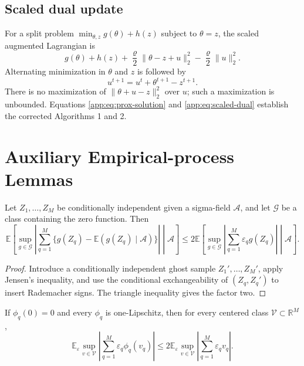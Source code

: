 \documentclass[twoside,11pt]{article}
\newenvironment{revision}{\color{revisionred}}{}
\begin{document}
\begin{revision}
\subsection{Scaled dual update}

For a split problem $\min_{\theta,z}g(\theta)+h(z)$ subject to $\theta=z$, the
scaled augmented Lagrangian is
\[
 g(\theta)+h(z)+\frac\varrho2\|\theta-z+u\|_2^2
 -\frac\varrho2\|u\|_2^2.
\]
Alternating minimization in $\theta$ and $z$ is followed by
\begin{equation}
 u^{t+1}=u^t+\theta^{t+1}-z^{t+1}.                              \label{app:eq:scaled-dual}
\end{equation}
There is no maximization of $\|\theta+u-z\|_2^2$ over $u$; such a maximization
is unbounded.  Equations \eqref{app:eq:prox-solution} and
\eqref{app:eq:scaled-dual} establish the corrected Algorithms 1 and 2.


\section{Auxiliary Empirical-process Lemmas}
\label{app:auxiliary}

\begin{lemma}
\label{app:lem:conditional-symm}
Let $Z_1,\ldots,Z_M$ be conditionally independent given a sigma-field
$\mathcal A$, and let $\mathcal G$ be a class containing the zero function.
Then
\[
 \mathbb E\left[\sup_{g\in\mathcal G}
 \left|\sum_{q=1}^M\{g(Z_q)-\mathbb E(g(Z_q)\mid\mathcal A)\}\right|
 \middle|\mathcal A\right]
 \le2\mathbb E\left[\sup_{g\in\mathcal G}
 \left|\sum_{q=1}^M\varepsilon_qg(Z_q)\right|
 \middle|\mathcal A\right].
\]
\end{lemma}

\begin{proof}
Introduce a conditionally independent ghost sample $Z_1',\ldots,Z_M'$, apply
Jensen's inequality, and use the conditional exchangeability of
$(Z_q,Z_q')$ to insert Rademacher signs.  The triangle inequality gives the
factor two.
\end{proof}

\begin{lemma}[Contraction]
\label{app:lem:contraction}
If $\phi_q(0)=0$ and every $\phi_q$ is one-Lipschitz, then for every centered
class $\mathcal V\subset\mathbb R^M$,
\[
 \mathbb E_\varepsilon\sup_{v\in\mathcal V}
 \left|\sum_{q=1}^M\varepsilon_q\phi_q(v_q)\right|
 \le2\mathbb E_\varepsilon\sup_{v\in\mathcal V}
 \left|\sum_{q=1}^M\varepsilon_qv_q\right|.
\]
\end{lemma}


\end{revision}
\end{document}
